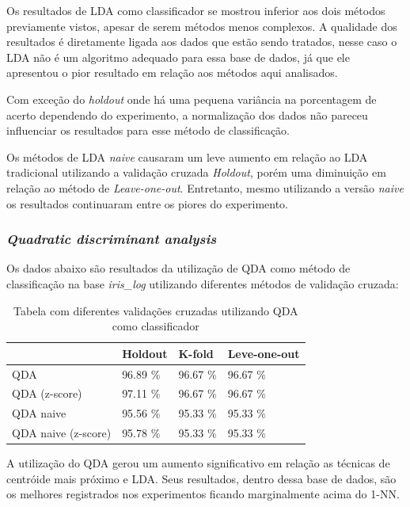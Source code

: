 \documentclass[paper=a4, fontsize=11pt]{scrartcl}
\numberwithin{equation}{section}		%
\numberwithin{figure}{section}			%
\numberwithin{table}{section}				%
\begin{document}
Os resultados de LDA como classificador se mostrou inferior aos dois métodos previamente vistos, apesar de serem métodos menos complexos. A qualidade dos resultados é diretamente ligada aos dados que estão sendo tratados, nesse caso o LDA não é um algoritmo adequado para essa base de dados, já que ele apresentou o pior resultado em relação aos métodos aqui analisados.

Com exceção do \textit{holdout} onde há uma pequena variância na porcentagem de acerto dependendo do experimento, a normalização dos dados não pareceu influenciar os resultados para esse método de classificação.

Os métodos de LDA \textit{naive} causaram um leve aumento em relação ao LDA tradicional utilizando a validação cruzada \textit{Holdout}, porém uma diminuição em relação ao método de \textit{Leave-one-out}. Entretanto, mesmo utilizando a versão \textit{naive} os resultados continuaram entre os piores do experimento.

\subsubsection{ \textit{Quadratic discriminant analysis} }

Os dados abaixo são resultados da utilização de QDA como método de classificação na base \textit{iris\_log} utilizando diferentes métodos de validação cruzada:

\begin{table}[h!]
\begin{tabular}{l|l|l|l|}
\cline{2-4}
                                                       & Holdout  & K-fold   & Leve-one-out \\ \hline
\multicolumn{1}{|l|}{QDA}                              & 96.89 \% & 96.67 \% & 96.67 \%     \\ \hline
\multicolumn{1}{|l|}{QDA (z-score)}                    & 97.11 \% & 96.67 \% & 96.67 \%     \\ \hline
\multicolumn{1}{|l|}{QDA naive}                        & 95.56 \% & 95.33 \% & 95.33 \%     \\ \hline
\multicolumn{1}{|l|}{QDA naive (z-score)}              & 95.78 \% & 95.33 \% & 95.33 \%     \\ \hline
\end{tabular}
\caption{Tabela com diferentes validações cruzadas utilizando QDA como classificador}
\end{table}

A utilização do QDA gerou um aumento significativo em relação as técnicas de centróide mais próximo e LDA. Seus resultados, dentro dessa base de dados, são os melhores registrados nos experimentos ficando marginalmente acima do 1-NN. 
\end{document}
